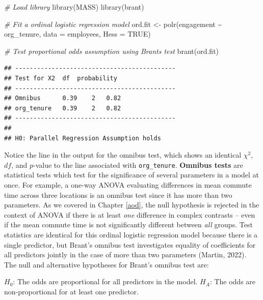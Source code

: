 \documentclass[
]{book}
\newenvironment{Shaded}{\begin{snugshade}}{\end{snugshade}}
\newcommand{\AttributeTok}[1]{\textcolor[rgb]{0.77,0.63,0.00}{#1}}
\newcommand{\CommentTok}[1]{\textcolor[rgb]{0.56,0.35,0.01}{\textit{#1}}}
\newcommand{\ConstantTok}[1]{\textcolor[rgb]{0.00,0.00,0.00}{#1}}
\newcommand{\FunctionTok}[1]{\textcolor[rgb]{0.00,0.00,0.00}{#1}}
\newcommand{\NormalTok}[1]{#1}
\newcommand{\OtherTok}[1]{\textcolor[rgb]{0.56,0.35,0.01}{#1}}
\newcommand{\SpecialCharTok}[1]{\textcolor[rgb]{0.00,0.00,0.00}{#1}}
\begin{document}
\begin{Shaded}
\begin{Highlighting}[]
\CommentTok{\# Load library}
\FunctionTok{library}\NormalTok{(MASS)}
\FunctionTok{library}\NormalTok{(brant)}

\CommentTok{\# Fit a ordinal logistic regression model}
\NormalTok{ord.fit }\OtherTok{\textless{}{-}} \FunctionTok{polr}\NormalTok{(engagement }\SpecialCharTok{\textasciitilde{}}\NormalTok{ org\_tenure, }\AttributeTok{data =}\NormalTok{ employees, }\AttributeTok{Hess =} \ConstantTok{TRUE}\NormalTok{)}

\CommentTok{\# Test proportional odds assumption using Brant\textquotesingle{}s test}
\FunctionTok{brant}\NormalTok{(ord.fit)}
\end{Highlighting}
\end{Shaded}

\begin{verbatim}
## -------------------------------------------- 
## Test for X2  df  probability 
## -------------------------------------------- 
## Omnibus      0.39    2   0.82
## org_tenure   0.39    2   0.82
## -------------------------------------------- 
## 
## H0: Parallel Regression Assumption holds
\end{verbatim}

Notice the line in the output for the omnibus test, which shows an identical \(\chi^2\), \(df\), and \(p\)-value to the line associated with \texttt{org\_tenure}. \textbf{Omnibus tests} are statistical tests which test for the significance of several parameters in a model at once. For example, a one-way ANOVA evaluating differences in mean commute time across three locations is an omnibus test since it has more than two parameters. As we covered in Chapter \ref{aod}, the null hypothesis is rejected in the context of ANOVA if there is at least \emph{one} difference in complex contrasts -- even if the mean commute time is not significantly different between \emph{all} groups. Test statistics are identical for this ordinal logistic regression model because there is a single predictor, but Brant's omnibus test investigates equality of coefficients for all predictors jointly in the case of more than two parameters (Martin, 2022). The null and alternative hypotheses for Brant's omnibus test are:

\(H_0\): The odds are proportional for all predictors in the model.
\(H_A\): The odds are non-proportional for at least one predictor.
\end{document}
